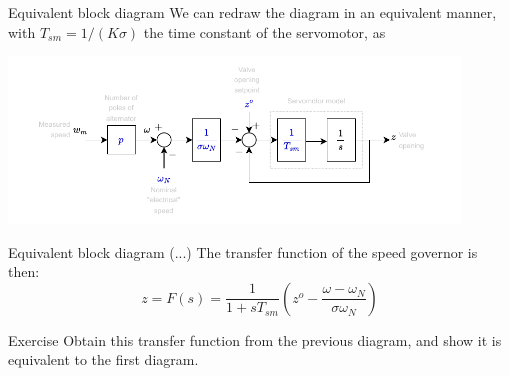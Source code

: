 \begin{frame}{Equivalent block diagram}
  We can redraw the diagram in an equivalent manner, with $T_{sm} = 1/(K \sigma)$ the time constant of the servomotor, as 
  \begin{center}
        \includegraphics[width=0.9\textwidth]{images/speed_governor_transfer_function_2.pdf}    
  \end{center}
\end{frame}

\begin{frame}{Equivalent block diagram (...)}
  The transfer function of the speed governor is then:
  $$z = F(s) = \frac{1}{1 + s T_{sm}} \left( z^{o} - \frac{\omega - \omega_{N}}{\sigma \omega_{N}} \right)$$
  
  \begin{block}{Exercise}
  Obtain this transfer function from the previous diagram, and show it is equivalent to the first diagram.
  \end{block}
\end{frame}


